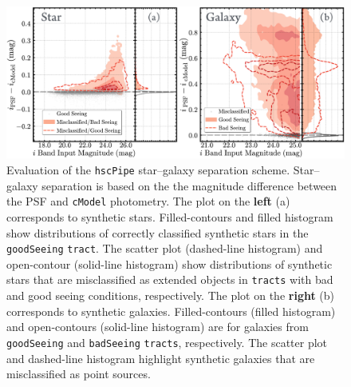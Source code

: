 \documentclass[useamsfonts]{pasj01}
\def\hscpipe{\texttt{hscPipe}}
\def\cmodel{\texttt{cModel}}
\def\tract{\texttt{tract}}
\def\tracts{\texttt{tracts}}
\begin{document}
\begin{figure}
    \begin{center}
        \includegraphics[width=\textwidth]{fig/synpipe_star_galaxy}
    \end{center}
    \caption{Evaluation of the \hscpipe{} star--galaxy separation scheme. 
        Star--galaxy separation is based on the the magnitude difference between the 
        PSF and \cmodel{} photometry. 
        The plot on the \textbf{left} (a) corresponds to synthetic stars. 
        Filled-contours and filled histogram show distributions of correctly classified
        synthetic stars in the \texttt{goodSeeing} \tract{}.
        The scatter plot (dashed-line histogram) and open-contour (solid-line histogram)
        show distributions of synthetic stars that are misclassified as extended
        objects in \tracts{} with bad and good seeing conditions, respectively.
        The plot on the \textbf{right} (b) corresponds to synthetic galaxies.
        Filled-contours (filled histogram) and open-contours (solid-line histogram)
        are for galaxies from \texttt{goodSeeing} and \texttt{badSeeing} \tracts{},
        respectively.
        The scatter plot and dashed-line histogram highlight synthetic galaxies that 
        are misclassified as point sources.}
    \label{fig:sg}
\end{figure}
\end{document}
